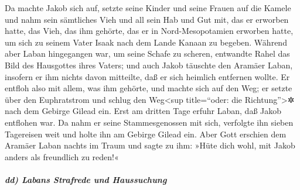 Da machte Jakob sich auf, setzte seine Kinder und seine
Frauen auf die Kamele  und nahm sein sämtliches Vieh und
all sein Hab und Gut mit, das er erworben hatte, das Vieh, das ihm
gehörte, das er in Nord-Mesopotamien erworben hatte, um sich zu seinem
Vater Isaak nach dem Lande Kanaan zu begeben.  Während
aber Laban hingegangen war, um seine Schafe zu scheren, entwandte Rahel
das Bild des Hausgottes ihres Vaters;  und auch Jakob
täuschte den Aramäer Laban, insofern er ihm nichts davon mitteilte, daß
er sich heimlich entfernen wollte.  Er entfloh also mit
allem, was ihm gehörte, und machte sich auf den Weg; er setzte über den
Euphratstrom und schlug den Weg\textless sup title=``oder: die
Richtung''\textgreater✲ nach dem Gebirge Gilead ein. 
Erst am dritten Tage erfuhr Laban, daß Jakob entflohen war.
 Da nahm er seine Stammesgenossen mit sich, verfolgte ihn
sieben Tagereisen weit und holte ihn am Gebirge Gilead ein.
 Aber Gott erschien dem Aramäer Laban nachts im Traum und
sagte zu ihm: »Hüte dich wohl, mit Jakob anders als freundlich zu
reden!«

\hypertarget{dd-labans-strafrede-und-haussuchung}{%
\subparagraph{dd) Labans Strafrede und
Haussuchung}\label{dd-labans-strafrede-und-haussuchung}}

